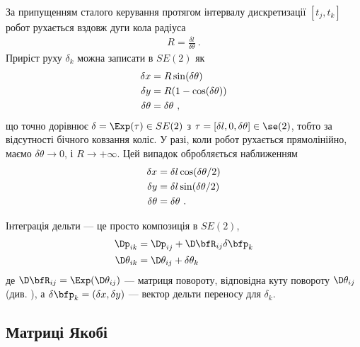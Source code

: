 За припущенням сталого керування протягом інтервалу дискретизації $[t_j,t_k]$ робот
рухається вздовж дуги кола радіуса
%
\begin{align}
R = \frac{\delta l}{\delta \theta} 
~.
\end{align}
%
Приріст руху $\delta_k$ можна записати в $SE(2)$ як
%
\begin{align}
\label{equ:diff_drive_exact_inte}
\delta x &= R\sin(\delta\theta) \notag\\
\delta y &= R(1-\cos(\delta\theta)) \\
\delta\theta &= \delta \theta \notag 
~,
\end{align}
%
що точно дорівнює $\delta=\Exp(\tau)\in SE(2)$ з $\tau=[\delta l,0,\delta \theta]\in\se(2)$, тобто за відсутності бічного ковзання коліс.
%
У разі, коли робот рухається прямолінійно, маємо $\delta \theta\to0$,
і $R\to+\infty$.
Цей випадок обробляється наближенням %
%
\begin{align}
\label{equ:diff_drive_runge_kutta_inte}
%
%
\delta x &= \delta l \cos(\delta\theta/2) \notag \\
%
\delta y &= \delta l \sin(\delta\theta/2) \\
%
\delta\theta &= \delta \theta \notag 
~.
\end{align}



Інтеграція дельти — це просто композиція в $SE(2)$,
%
\begin{align}\label{equ:diff_drive_composition}
\begin{split}
\Dp_{ik} &= \Dp_{ij} + \D\bfR_{ij}\delta \bfp_k \\
\D\theta_{ik} &= \D\theta_{ij} + \delta\theta_k
\end{split}
\end{align}
%
де $\D\bfR_{ij}=\Exp(\D\theta_{ij})$ — матриця повороту, відповідна куту повороту $\D\theta_{ij}$ (див.
), а $\delta \bfp_k=(\delta x,\delta y)$ — вектор дельти переносу для $\delta_k$.


\subsection{Матриці Якобі}
\label{sec:diff_drive_jacs}
%
